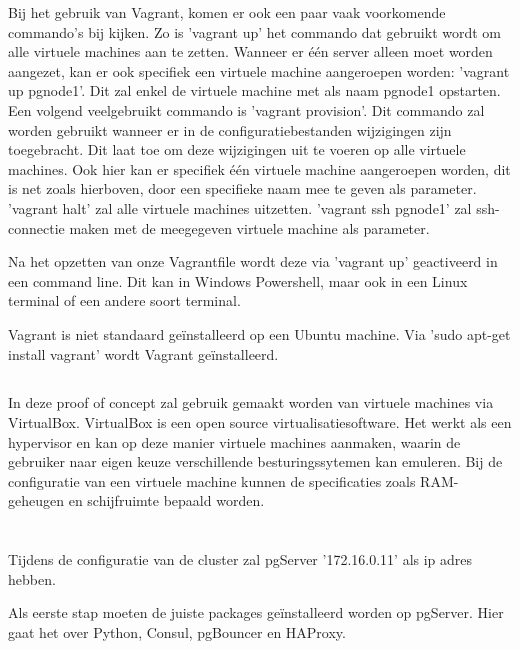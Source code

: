 Bij het gebruik van Vagrant, komen er ook een paar vaak voorkomende commando's bij kijken. Zo is 'vagrant up' het commando dat gebruikt wordt om alle virtuele machines aan te zetten. Wanneer er één server alleen moet worden aangezet, kan er ook specifiek een virtuele machine aangeroepen worden: 'vagrant up pgnode1'. Dit zal enkel de virtuele machine met als naam pgnode1 opstarten. Een volgend veelgebruikt commando is 'vagrant provision'. Dit commando zal worden gebruikt wanneer er in de configuratiebestanden wijzigingen zijn toegebracht. Dit laat toe om deze wijzigingen uit te voeren op alle virtuele machines. Ook hier kan er specifiek één virtuele machine aangeroepen worden, dit is net zoals hierboven, door een specifieke naam mee te geven als parameter. 'vagrant halt' zal alle virtuele machines uitzetten. 'vagrant ssh pgnode1' zal ssh-connectie maken met de meegegeven virtuele machine als parameter.

Na het opzetten van onze Vagrantfile wordt deze via 'vagrant up' geactiveerd in een command line. Dit kan in Windows Powershell, maar ook in een Linux terminal of een andere soort terminal.

Vagrant is niet standaard geïnstalleerd op een Ubuntu machine. Via 'sudo apt-get install vagrant' wordt Vagrant geïnstalleerd.

\subsection{}
\label{subsec:VirtualBox}
In deze proof of concept zal gebruik gemaakt worden van virtuele machines via VirtualBox. VirtualBox is een open source virtualisatiesoftware. Het werkt als een hypervisor en kan op deze manier virtuele machines aanmaken, waarin de gebruiker naar eigen keuze verschillende besturingssytemen kan emuleren. Bij de configuratie van een virtuele machine kunnen de specificaties zoals RAM-geheugen en schijfruimte bepaald worden.



\section{}
\label{sec:pgServer}
Tijdens de configuratie van de cluster zal pgServer '172.16.0.11' als ip adres hebben.

Als eerste stap moeten de juiste packages geïnstalleerd worden op pgServer. Hier gaat het over Python, Consul, pgBouncer en HAProxy.

